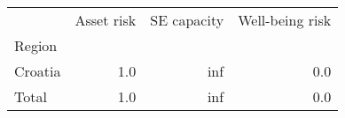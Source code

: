 \begin{tabular}{lrrr}
\toprule
{} &  Asset risk &  SE capacity &  Well-being risk \\
Region  &             &              &                  \\
\midrule
Croatia &         1.0 &          inf &              0.0 \\
Total   &         1.0 &          inf &              0.0 \\
\bottomrule
\end{tabular}

